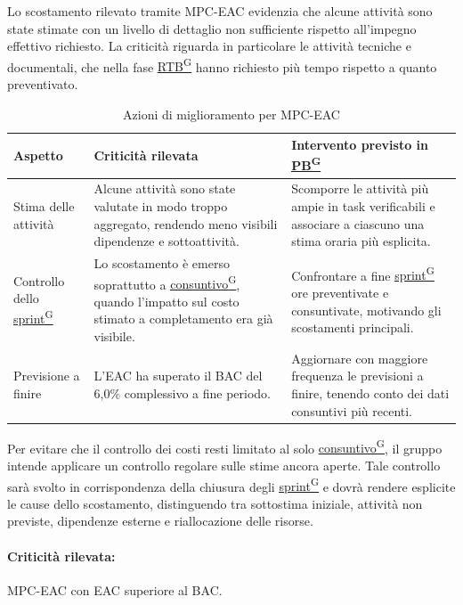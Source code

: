\documentclass[a4paper,12pt]{article}
\providecommand{\glslink}[2]{\href{https://alittlebyte-19.github.io/Documentazione/glossario.html\#gls-#1}{\underline{#2}\textsuperscript{\scriptsize G}}}
\begin{document}
Lo scostamento rilevato tramite MPC-EAC evidenzia che alcune attività sono state stimate con un livello di dettaglio non sufficiente rispetto all'impegno effettivo richiesto. La criticità riguarda in particolare le attività tecniche e documentali, che nella fase \glslink{rtb-requirements-and-technology-baseline}{RTB} hanno richiesto più tempo rispetto a quanto preventivato.

\begin{table}[H]
    \centering
    \renewcommand{\arraystretch}{1.25}
    \begin{tabularx}{\textwidth}{|p{3cm}|X|X|}
        \hline
        \rowcolor{gray!35}
        \textbf{Aspetto} & \textbf{Criticità rilevata} & \textbf{Intervento previsto in \glslink{pb-product-baseline}{PB}} \\
        \hline
        Stima delle attività & Alcune attività sono state valutate in modo troppo aggregato, rendendo meno visibili dipendenze e sottoattività. & Scomporre le attività più ampie in task verificabili e associare a ciascuno una stima oraria più esplicita. \\
        \hline
        Controllo dello \glslink{sprint}{sprint} & Lo scostamento è emerso soprattutto a \glslink{consuntivo}{consuntivo}, quando l'impatto sul costo stimato a completamento era già visibile. & Confrontare a fine \glslink{sprint}{sprint} ore preventivate e consuntivate, motivando gli scostamenti principali. \\
        \hline
        Previsione a finire & L'EAC ha superato il BAC del 6,0\% complessivo a fine periodo. & Aggiornare con maggiore frequenza le previsioni a finire, tenendo conto dei dati consuntivi più recenti. \\
        \hline
    \end{tabularx}
    \caption{Azioni di miglioramento per MPC-EAC}
\end{table}

Per evitare che il controllo dei costi resti limitato al solo \glslink{consuntivo}{consuntivo}, il gruppo intende applicare un controllo regolare sulle stime ancora aperte. Tale controllo sarà svolto in corrispondenza della chiusura degli \glslink{sprint}{sprint} e dovrà rendere esplicite le cause dello scostamento, distinguendo tra sottostima iniziale, attività non previste, dipendenze esterne e riallocazione delle risorse.

\paragraph*{Criticità rilevata:} MPC-EAC con EAC superiore al BAC.
\end{document}
